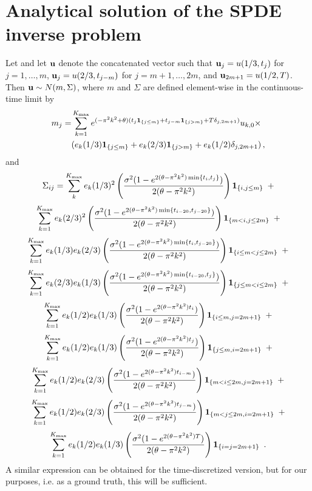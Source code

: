 \documentclass[english]{article}
\begin{document}
\section{Analytical solution of the SPDE inverse problem}
\label{app:spde}

Let 
and let ${\bf u}$ denote the concatenated vector such that 
${\bf u}_{j}=u(1/3,t_j)$ for $j=1,\dots , m$, 
${\bf u}_{j}=u(2/3,t_{j-m})$ for $j=m+1,\dots, 2m$,
and ${\bf u}_{2m+1}=u(1/2,T)$.
Then ${\bf u} \sim N(m,\Sigma)$, 
where $m$ and $\Sigma$ are defined 
element-wise in the continuous-time limit by
\[\begin{split}
m_{j} = & \sum_{k=1}^{K_{\max}} e^{(-\pi^2 k^2 + \theta)
(t_j {\bf 1}_{\{j\leq m\}} + t_{j-m} {\bf 1}_{\{j> m\}}+T\delta_{j,2m+1})} u_{k,0} \times \\
& (e_k(1/3) {\bf 1}_{\{j\leq m\}} + e_k(2/3) {\bf 1}_{\{j> m\}} + e_k(1/2)\delta_{j,2m+1}) \, ,
\end{split} \]
and
$$
\Sigma_{ij} = 
\sum_{k}^{K_{\max}} e_k(1/3)^2
\left(\frac{\sigma^2(1-e^{2(\theta-\pi^2k^2)\min\{t_i,t_j\}})}{2(\theta-\pi^2k^2)}\right) 
{\bf 1}_{\{i,j \leq m\}} \ \,
+ 
$$
$$
\sum_{k=1}^{K_{\max}} e_k(2/3)^2 \left(\frac{\sigma^2(1-e^{2(\theta-\pi^2k^2)\min\{t_{i-20},t_{j-20}\}})}{2(\theta-\pi^2k^2)}\right) {\bf 1}_{\{m<i,j\leq 2m\}} \ \, +
$$
$$
\sum_{k=1}^{K_{\max}} e_k(1/3)e_k(2/3)\left(\frac{\sigma^2(1-e^{2(\theta-\pi^2k^2)\min\{t_i,t_{j-20}\}})}{2(\theta-\pi^2k^2)}\right) {\bf 1}_{\{i\leq m < j \leq 2m\}} \ \, + 
$$
$$
\sum_{k=1}^{K_{\max}} e_k(2/3)e_k(1/3)\left(\frac{\sigma^2(1-e^{2(\theta-\pi^2k^2)\min\{t_{i-20},t_{j}\}})}{2(\theta-\pi^2k^2)}\right) {\bf 1}_{\{j \leq m < i \leq 2m\}} \ \, + 
$$
$$
\sum_{k=1}^{K_{\max}} e_k(1/2)e_k(1/3)\left(\frac{\sigma^2(1-e^{2(\theta-\pi^2k^2)t_i})}{2(\theta-\pi^2k^2)}\right) {\bf 1}_{\{i \leq m, j=2m +1\}} \ \, + 
$$
$$
\sum_{k=1}^{K_{\max}} e_k(1/2)e_k(1/3)\left(\frac{\sigma^2(1-e^{2(\theta-\pi^2k^2)t_j})}{2(\theta-\pi^2k^2)}\right) {\bf 1}_{\{j \leq m, i=2m +1\}} \ \, + 
$$
$$
\sum_{k=1}^{K_{\max}} e_k(1/2)e_k(2/3)\left(\frac{\sigma^2(1-e^{2(\theta-\pi^2k^2)t_{i-m}})}{2(\theta-\pi^2k^2)}\right) {\bf 1}_{\{m< i \leq 2m, j=2m +1\}} \ \, + 
$$
$$
\sum_{k=1}^{K_{\max}} e_k(1/2)e_k(2/3)\left(\frac{\sigma^2(1-e^{2(\theta-\pi^2k^2)t_{j-m}})}{2(\theta-\pi^2k^2)}\right) {\bf 1}_{\{m< j \leq 2m, i=2m +1\}} \ \, + 
$$
$$
\sum_{k=1}^{K_{\max}} e_k(1/2)e_k(1/3)\left(\frac{\sigma^2(1-e^{2(\theta-\pi^2k^2)T})}{2(\theta-\pi^2k^2)}\right) {\bf 1}_{\{i=j=2m +1\}} \ \, .
$$
A similar expression can be obtained for the time-discretized version, 
but for our purposes, i.e. as a ground truth, this will be sufficient.
\end{document}
